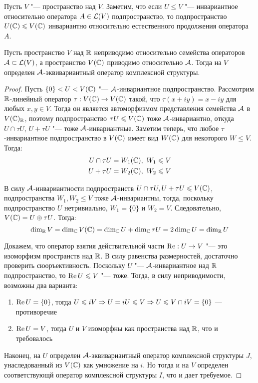 \begin{note}
	Пусть $V$ "--- пространство над $V$. Заметим, что если $U \le V$ "--- инвариантное относительно оператора $A \in \mathcal L(V)$ подпространство, то подпространство $U(\mathbb{C}) \leqslant V(\mathbb{C})$ инвариантно относительно естественного продолжения оператора $A$.
\end{note}

\begin{theorem}
	Пусть пространство $V$ над $\mathbb{R}$ неприводимо относительно семейства операторов $\mathcal A \subset \mathcal L(V)$, а пространство $V(\mathbb{C})$ приводимо относительно $\mathcal A$. Тогда на $V$ определен $\mathcal A$-эквивариантный оператор комплексной структуры.
\end{theorem}

\begin{proof}
	Пусть $\{0\} < U < V(\mathbb{C})$ "--- $\mathcal A$-инвариантное подпространство. Рассмотрим $\mathbb{R}$-линейный оператор $\tau : V(\mathbb{C}) \to V(\mathbb{C})$ такой, что $\tau (x + iy) = x - iy$ для любых $x, y \in V$. Тогда он является автоморфизмом представления семейства $\mathcal A$ в $V(\mathbb{C})_{\mathbb{R}}$, поэтому подпространство $\tau U \leqslant V(\mathbb{C})$ тоже $\mathcal A$-инвариантно, откуда $U \cap \tau U$, $U + \tau U$ "--- тоже $\mathcal A$-инвариантные. Заметим теперь, что любое $\tau$-инвариантное подпространство в $V(\mathbb{C})$ имеет вид $W(\mathbb{C})$ для некоторого $W \le V$. Тогда:
	\begin{align*}
		U \cap \tau U &= W_1(\mathbb{C}),~W_1 \leqslant V\\
		U + \tau U &= W_2(\mathbb{C}),~W_2 \leqslant V
	\end{align*}
	
	В силу $\mathcal A$-инвариантности подпространств $U \cap \tau U, U + \tau U \leqslant V(\mathbb{C})$, подпространства $W_1, W_2 \le V$ тоже $\mathcal A$-инвариантны, тогда, поскольку подпространство $U$ нетривиально, $W_1 = \{0\}$ и $W_2 = V$. Следовательно, $V(\mathbb{C}) = U \oplus \tau U$. Тогда:
	\[\dim_{\mathbb{R}} V = \dim_{\mathbb{C}} V(\mathbb{C}) = \dim_{\mathbb{C}} U + \dim_{\mathbb{C}} \tau U = 2\dim_{\mathbb{C}} U = \dim_{\mathbb{R}} U\]
	
	Докажем, что оператор взятия действительной части $\operatorname{Re} : U \to V$ "--- это изоморфизм пространств над $\mathbb{R}$. В силу равенства размерностей, достаточно проверить сюоръективность. Поскольку $U$ "--- $\mathcal A$-инвариантное над $\mathbb{R}$ подпространство, то $\operatorname{Re} U \leqslant V$ "--- тоже. Тогда, в силу неприводимости, возможны два варианта:
	\begin{enumerate}
		\item $\operatorname{Re} U= \{0\}$, тогда $U \leqslant iV \Rightarrow U = iU \leqslant V \Rightarrow U \leqslant V \cap iV = \{0\}$ --- противоречие
		\item $\operatorname{Re} U = V$, тогда $U$ и $V$ изоморфны как пространства над $\mathbb{R}$, что и требовалось
	\end{enumerate} 
		
	Наконец, на $U$ определен $\mathcal A$-эквивариантный оператор комплексной структуры $J$, унаследованный из $V(\mathbb{C})$ как умножение на $i$. Но тогда и на $V$ определен соответствующй оператор комплексной структуры $I$, что и дает требуемое.
\end{proof}

